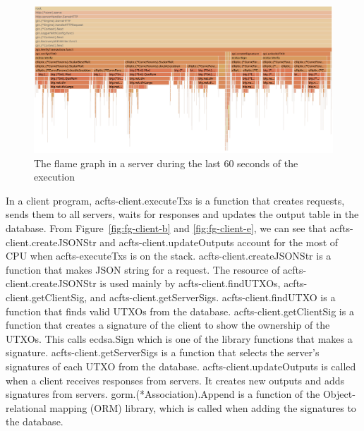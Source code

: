 \documentclass[a4paper, oneside]{discothesis}
\begin{document}
\begin{figure}[p]
    \begin{center}
        \includegraphics[width=\columnwidth]{figures/flame_graph_server_ending}
        \caption{The flame graph in a server during the last 60 seconds of the execution}
        \label{fig:fg-server-e}
    \end{center}
\end{figure}

In a client program, acfts-client.executeTxs is a function that creates requests,
sends them to all servers, waits for responses and updates the output table in the database.
From Figure~\ref{fig:fg-client-b} and \ref{fig:fg-client-e}, we can see
that acfts-client.createJSONStr and acfts-client.updateOutputs account for
the most of CPU when acfts-executeTxs is on the stack.
acfts-client.createJSONStr is a function that makes JSON string for a request.
The resource of acfts-client.createJSONStr is used mainly by acfts-client.findUTXOs,
acfts-client.getClientSig, and acfts-client.getServerSigs.
acfts-client.findUTXO is a function that finds valid UTXOs from the database.
acfts-client.getClientSig is a function that creates a signature of the client
to show the ownership of the UTXOs.
This calls ecdsa.Sign which is one of the library functions that makes a signature.
acfts-client.getServerSigs is a function that selects the server's signatures
of each UTXO from the database.
acfts-client.updateOutputs is called when a client receives responses from servers.
It creates new outputs and adds signatures from servers.
gorm.(*Association).Append is a function of the Object-relational mapping (ORM) library,
which is called when adding the signatures to the database.
\end{document}
